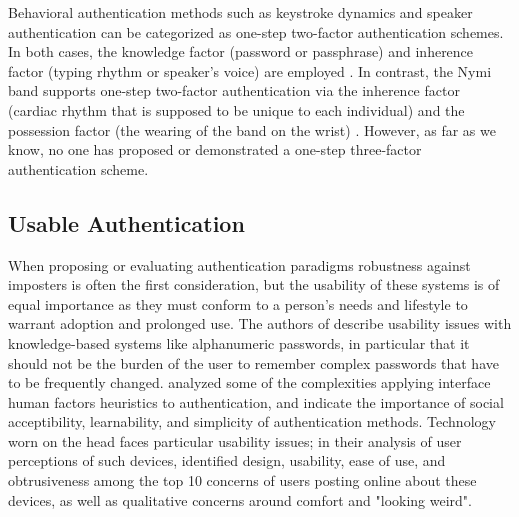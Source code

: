 \documentclass{sigchi}
\begin{document}

Behavioral authentication methods such as keystroke dynamics and speaker authentication can be categorized as one-step two-factor authentication schemes. In both cases, the knowledge factor (password or passphrase) and inherence factor (typing rhythm or speaker's voice) are employed \cite{Monrose1997}. In contrast, the Nymi band supports one-step two-factor authentication via the inherence factor (cardiac rhythm that is supposed to be unique to each individual) and the possession factor (the wearing of the band on the wrist) \cite{Nymi}. However, as far as we know, no one has proposed or demonstrated a one-step three-factor authentication scheme.%

\subsection{Usable Authentication}

When proposing or evaluating authentication paradigms robustness against imposters is often the first consideration, but the usability of these systems is of equal importance as they must conform to a person's needs and lifestyle to warrant adoption and prolonged use. The authors of \cite{sasse2001} describe usability issues with knowledge-based systems like alphanumeric passwords, in particular that it should not be the burden of the user to remember complex passwords that have to be frequently changed. \cite{braz2006} analyzed some of the complexities applying interface human factors heuristics to authentication, and indicate the importance of social acceptibility, learnability, and simplicity of authentication methods. Technology worn on the head faces particular usability issues; in their analysis of user perceptions of such devices, \cite{Genaro2014} identified design, usability, ease of use, and obtrusiveness among the top 10 concerns of users posting online about these devices, as well as qualitative concerns around comfort and "looking weird".
\end{document}
